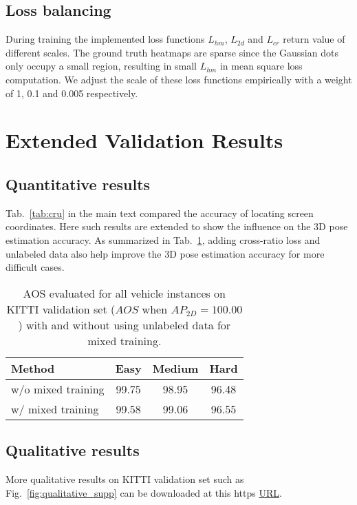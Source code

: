 \documentclass[final]{cvpr}
\begin{document}
\subsection{Loss balancing}
During training the implemented loss functions $L_{hm}$, $L_{2d}$ and $L_{cr}$ return value of different scales. The ground truth heatmaps are sparse since the Gaussian dots only occupy a small region, resulting in small $L_{hm}$ in mean square loss computation. We adjust the scale of these loss functions empirically with a weight of 1, 0.1 and 0.005 respectively. 

\section{Extended Validation Results} \label{sec3}
\subsection{Quantitative results}
Tab.~\ref{tab:cru} in the main text compared the accuracy of locating screen coordinates. Here such results are extended to show the influence on the 3D pose estimation accuracy. As summarized in Tab.~\ref{tab:cru2}, adding cross-ratio loss and unlabeled data also help improve the 3D pose estimation accuracy for more difficult cases.

\begin{table}[h]
	\centering
	\begin{tabular}{|l|c|c|c|}
		\hline
		Method &  Easy & Medium & Hard \\
		\hline
		\rowcolor{grayDark}
		w/o mixed training  &  99.75 &98.95  &96.48 \\
		\rowcolor{grayLight}
		w/ mixed training &99.58  &99.06  &96.55\\	
		\hline
	\end{tabular}
	\caption{AOS evaluated for all vehicle instances on KITTI validation set ($AOS$ when $AP_{2D}=100.00$) with and without using unlabeled data for mixed training.}
	\label{tab:cru2}
\end{table} 

\subsection{Qualitative results}

More qualitative results on KITTI validation set such as Fig.~\ref{fig:qualitative_supp} can be downloaded at this https \href{https://drive.google.com/drive/folders/1pHDkVcAxeK2QGZuSkz9qIGcEMgsty-oU?usp=sharing}{URL}.
\end{document}
